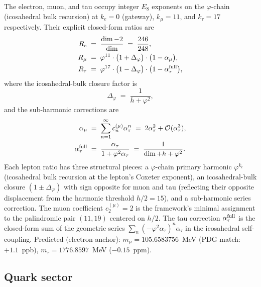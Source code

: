 ﻿\documentclass[reprint,amsmath,amssymb,aps,prd,longbibliography,floatfix]{revtex4-2}
\begin{document}
The electron, muon, and tau occupy integer $E_8$ exponents on the
$\varphi$-chain (icosahedral bulk recursion) at $k_e = 0$ (gateway),
$k_\mu = 11$, and $k_\tau = 17$ respectively. Their explicit
closed-form ratios are
\begin{align}
R_e \;&=\; \frac{\dim - 2}{\dim} \;=\; \frac{246}{248},
   \label{eq:Re} \\
R_\mu \;&=\; \varphi^{11} \cdot \bigl(1 + \Delta_\varphi\bigr) \cdot \bigl(1 - \alpha_\mu\bigr),
   \label{eq:Rmu} \\
R_\tau \;&=\; \varphi^{17} \cdot \bigl(1 - \Delta_\varphi\bigr) \cdot \bigl(1 - \alpha_\tau^{\rm full}\bigr),
   \label{eq:Rtau}
\end{align}
where the icosahedral-bulk closure factor is
\begin{equation}
\Delta_\varphi \;=\; \frac{1}{h + \varphi^2},
\label{eq:Deltaphi-lepton}
\end{equation}
and the sub-harmonic corrections are
\begin{align}
\alpha_\mu \;&=\; \sum_{n=1}^{\infty} c_n^{(\mu)} \alpha_\tau^n
            \;=\; 2 \alpha_\tau^2 + \mathcal{O}(\alpha_\tau^3),
   \label{eq:alphamu} \\
\alpha_\tau^{\rm full} \;&=\; \frac{\alpha_\tau}{1 + \varphi^2 \alpha_\tau}
            \;=\; \frac{1}{\dim + h + \varphi^2}.
   \label{eq:alphataufull}
\end{align}
Each lepton ratio has three structural pieces: a $\varphi$-chain
primary harmonic $\varphi^{k_\ell}$ (icosahedral bulk recursion at
the lepton's Coxeter exponent), an icosahedral-bulk closure
$(1 \pm \Delta_\varphi)$ with sign opposite for muon and tau
(reflecting their opposite displacement from the harmonic threshold
$h/2 = 15$), and a sub-harmonic series correction. The muon
coefficient $c_2^{(\mu)} = 2$ is the framework's minimal assignment to
the palindromic pair $(11, 19)$ centered on $h/2$. The
tau correction $\alpha_\tau^{\rm full}$ is the closed-form sum of the
geometric series $\sum_n (-\varphi^2 \alpha_\tau)^n \alpha_\tau$ in
the icosahedral self-coupling.
Predicted (electron-anchor): $m_\mu = 105.6583756$~MeV (PDG match:
$+1.1$~ppb), $m_\tau = 1776.8597$~MeV ($-0.15$~ppm).

\subsection{Quark sector}
\end{document}
